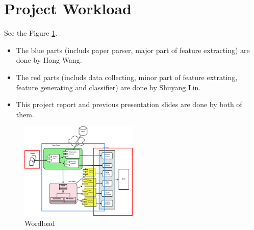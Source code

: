 \documentclass[11pt,letterpaper]{article}
\begin{document}
\section{Project Workload}
See the Figure \ref{fig:workload}.
\begin{itemize}
\item The blue parts (includs paper parser, major part of feature extracting) are done by Hong Wang.
\item	The red parts (includs data collecting, minor part of feature extrating, feature generating and classifier) are done by Shuyang Lin.
\item	This project report and previous presentation slides are done by both of them. 
\end{itemize}


\begin{figure}[htb]
  \centering
	 	 \includegraphics[width=0.5\textwidth]{materials/workload.eps}
		\caption{Wordload}
		\label{fig:workload}
\end{figure}
\end{document}
